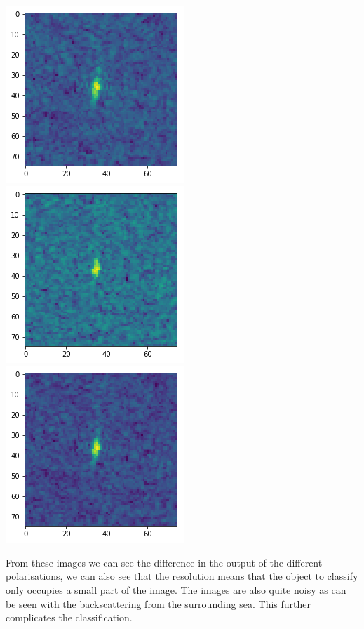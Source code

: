 \documentclass{article}
\begin{document}
\includegraphics[scale=0.33]{heatmap-ship-band-1}
\includegraphics[scale=0.33]{heatmap-ship-band-2}
\includegraphics[scale=0.33]{heatmap-ship-band3-avg}

From these images we can see the difference in the output of the different polarisations, we can also see that the resolution means that the object to classify only occupies a small part of the image. The images are also quite noisy as can be seen with the backscattering from the surrounding sea. This further complicates the classification. 

 
\end{document}
